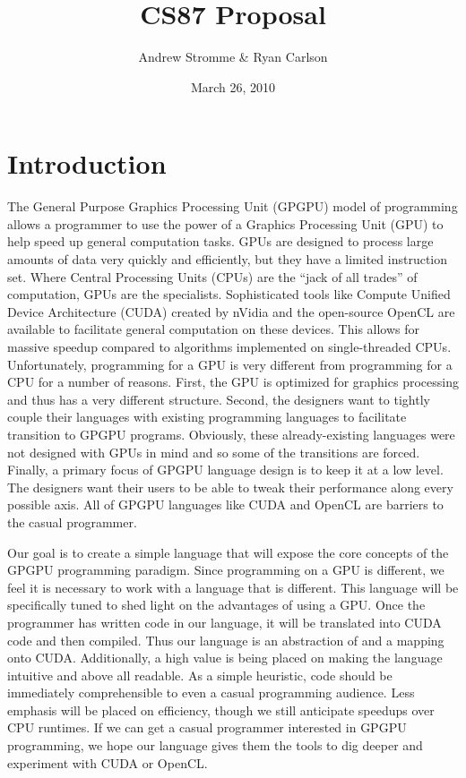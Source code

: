\documentclass{article}
\begin{document}
\title{CS87 Proposal}
\author{Andrew Stromme \& Ryan Carlson}
\date{March 26, 2010}
\maketitle

\section{Introduction}

The General Purpose Graphics Processing Unit (GPGPU) model of programming allows a programmer to use the power of a Graphics Processing Unit (GPU) to help speed up general computation tasks. GPUs are designed to process large amounts of data very quickly and efficiently, but they have a limited instruction set. Where Central Processing Units (CPUs) are the ``jack of all trades'' of computation, GPUs are the specialists. Sophisticated tools like Compute Unified Device Architecture (CUDA) created by nVidia and the open-source OpenCL are available to facilitate general computation on these devices. This allows for massive speedup compared to algorithms implemented on single-threaded CPUs. Unfortunately, programming for a GPU is very different from programming for a CPU for a number of reasons. First, the GPU is optimized for graphics processing and thus has a very different structure. Second, the designers want to tightly couple their languages with existing programming languages to facilitate transition to GPGPU programs. Obviously, these already-existing languages were not designed with GPUs in mind and so some of the transitions are forced. Finally, a primary focus of GPGPU language design is to keep it at a low level. The designers want their users to be able to tweak their performance along every possible axis. All of GPGPU languages like CUDA and OpenCL are barriers to the casual programmer.

Our goal is to create a simple language that will expose the core concepts of the GPGPU programming paradigm. Since programming on a GPU is different, we feel it is necessary to work with a language that is different. This language will be specifically tuned to shed light on the advantages of using a GPU. Once the programmer has written code in our language, it will be translated into CUDA code and then compiled. Thus our language is an abstraction of and a mapping onto CUDA. Additionally, a high value is being placed on making the language intuitive and above all readable. As a simple heuristic, code should be immediately comprehensible to even a casual programming audience. Less emphasis will be placed on efficiency, though we still anticipate speedups over CPU runtimes. If we can get a casual programmer interested in GPGPU programming, we hope our language gives them the tools to dig deeper and experiment with CUDA or OpenCL.
\end{document}
